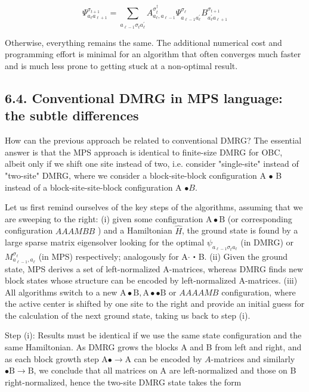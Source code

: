 \documentclass[12pt]{article}
\begin{document}
\begin{equation*}
\Psi_{a_{\ell} a_{\ell+1}}^{\sigma_{t+1}}=\sum_{a_{\ell-1} \sigma_{t} a_{\ell}^{\prime}} A_{a_{\ell}, a_{\ell-1}}^{\sigma_{t}^{\dagger}} \Psi_{a_{\ell-1} a_{\ell}^{\prime}}^{\sigma_{\ell}} B_{a_{\ell}^{\prime} a_{\ell+1}}^{\sigma_{t+1}} \tag{218}
\end{equation*}


Otherwise, everything remains the same. The additional numerical cost and programming effort is minimal for an algorithm that often converges much faster and is much less prone to getting stuck at a non-optimal result.

\subsection*{6.4. Conventional DMRG in MPS language: the subtle differences}
How can the previous approach be related to conventional DMRG? The essential answer is that the MPS approach is identical to finite-size DMRG for OBC, albeit only if we shift one site instead of two, i.e. consider "single-site" instead of "two-site" DMRG, where we consider a block-site-block configuration A $\bullet$ B instead of a block-site-site-block configuration A $\bullet B$.

Let us first remind ourselves of the key steps of the algorithms, assuming that we are sweeping to the right: (i) given some configuration $\mathrm{A} \bullet \mathrm{B}$ (or corresponding configuration $A A A M B B$ ) and a Hamiltonian $\hat{H}$, the ground state is found by a large sparse matrix eigensolver looking for the optimal $\psi_{a_{\ell-1} \sigma_{t} a_{\ell}}$ (in DMRG) or $M_{a_{\ell-1}, a_{\ell}}^{\sigma_{\ell}}$ (in MPS) respectively; analogously for A$\cdot$・B. (ii) Given the ground state, MPS derives a set of left-normalized A-matrices, whereas DMRG finds new block states whose structure can be encoded by left-normalized A-matrices. (iii) All algorithms switch to a new $\mathrm{A} \bullet \mathrm{B}, \mathrm{A} \bullet \bullet \mathrm{B}$ or $A A A A M B$ configuration, where the active center is shifted by one site to the right and provide an initial guess for the calculation of the next ground state, taking us back to step (i).

Step (i): Results must be identical if we use the same state configuration and the same Hamiltonian. As DMRG grows the blocks A and B from left and right, and as each block growth step $\mathrm{A} \bullet \rightarrow \mathrm{A}$ can be encoded by $A$-matrices and similarly $\bullet \mathrm{B} \rightarrow \mathrm{B}$, we conclude that all matrices on A are left-normalized and those on B right-normalized, hence the two-site DMRG state takes the form
\end{document}
